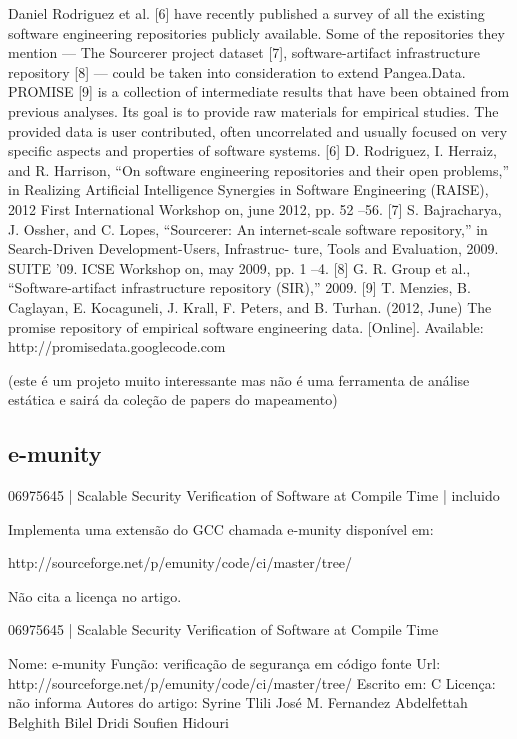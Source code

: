 Daniel Rodriguez et al. [6] have recently published a survey
of all the existing software engineering repositories publicly
available. Some of the repositories they mention — The
Sourcerer project dataset [7], software-artifact infrastructure
repository [8] — could be taken into consideration to extend
Pangea.Data.
PROMISE [9] is a collection of intermediate results that
have been obtained from previous analyses. Its goal is to
provide raw materials for empirical studies. The provided data
is user contributed, often uncorrelated and usually focused on
very specific aspects and properties of software systems.
[6] D. Rodriguez, I. Herraiz, and R. Harrison, “On software engineering
repositories and their open problems,” in Realizing Artificial Intelligence
Synergies in Software Engineering (RAISE), 2012 First International
Workshop on, june 2012, pp. 52 –56.
[7] S. Bajracharya, J. Ossher, and C. Lopes, “Sourcerer: An internet-scale
software repository,” in Search-Driven Development-Users, Infrastruc-
ture, Tools and Evaluation, 2009. SUITE ’09. ICSE Workshop on, may
2009, pp. 1 –4.
[8] G. R. Group et al., “Software-artifact infrastructure repository (SIR),”
2009.
[9] T. Menzies, B. Caglayan, E. Kocaguneli, J. Krall, F. Peters, and
B. Turhan. (2012, June) The promise repository of empirical software
engineering data. [Online]. Available: http://promisedata.googlecode.com

(este é um projeto muito interessante mas não é uma ferramenta de análise
estática e sairá da coleção de papers do mapeamento)

\subsection{e-munity}

06975645 | Scalable Security Verification of Software at Compile Time | incluido

Implementa uma extensão do GCC chamada e-munity disponível em:

http://sourceforge.net/p/emunity/code/ci/master/tree/

Não cita a licença no artigo.

06975645 | Scalable Security Verification of Software at Compile Time

Nome: e-munity
Função: verificação de segurança em código fonte
Url: http://sourceforge.net/p/emunity/code/ci/master/tree/
Escrito em: C
Licença: não informa
Autores do artigo: Syrine Tlili
                   José M. Fernandez
                   Abdelfettah Belghith
                   Bilel Dridi
                   Soufien Hidouri

